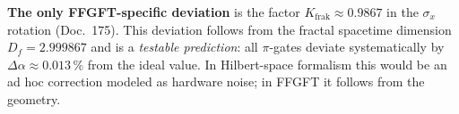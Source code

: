 \begin{center}
\renewcommand{\arraystretch}{1.4}
{\small
{}
}
\renewcommand{\arraystretch}{1.0}
\end{center}

\textbf{The only FFGFT-specific deviation} is the factor
$K_{\text{frak}} \approx 0.9867$ in the $\sigma_x$ rotation
(Doc.~175). This deviation follows from the fractal spacetime
dimension $D_f = 2.999867$ and is a \emph{testable prediction}: all
$\pi$-gates deviate systematically by $\Delta\alpha \approx 0.013\,\%$
from the ideal value. In Hilbert-space formalism this would be an
ad hoc correction modeled as hardware noise; in FFGFT it follows
from the geometry.

